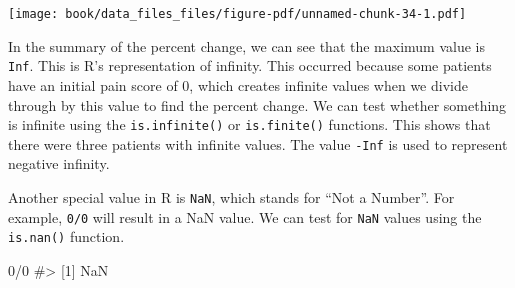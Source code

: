 \documentclass[
  letterpaper,
]{krantz}
\makeatletter
\newenvironment{Shaded}{\begin{snugshade}}{\end{snugshade}}
\newcommand{\CommentTok}[1]{\textcolor[rgb]{0.37,0.37,0.37}{#1}}
\newcommand{\DecValTok}[1]{\textcolor[rgb]{0.68,0.00,0.00}{#1}}
\newcommand{\FunctionTok}[1]{\textcolor[rgb]{0.28,0.35,0.67}{#1}}
\newcommand{\NormalTok}[1]{\textcolor[rgb]{0.00,0.23,0.31}{#1}}
\newcommand{\OtherTok}[1]{\textcolor[rgb]{0.00,0.23,0.31}{#1}}
\newcommand{\SpecialCharTok}[1]{\textcolor[rgb]{0.37,0.37,0.37}{#1}}
\newenvironment{kframe}{%
\medskip{}
\setlength{\fboxsep}{.8em}
 \def\at@end@of@kframe{}%
 \ifinner\ifhmode%
  \def\at@end@of@kframe{\end{minipage}}%
  \begin{minipage}{\columnwidth}%
 \fi\fi%
 \def\FrameCommand##1{\hskip\@totalleftmargin \hskip-\fboxsep
 \colorbox{shadecolor}{##1}\hskip-\fboxsep
     \hskip-\linewidth \hskip-\@totalleftmargin \hskip\columnwidth}%
 \MakeFramed {\advance\hsize-\width
   \@totalleftmargin\z@ \linewidth\hsize
   \@setminipage}}%
 {\par\unskip\endMakeFramed%
 \at@end@of@kframe}
\renewenvironment{Shaded}{\begin{kframe}}{\end{kframe}}
\makeatother
\begin{document}
\begin{center}
\texttt{[image: book/data\_files\_files/figure-pdf/unnamed-chunk-34-1.pdf]}
\end{center}

\begin{Shaded}
\end{Shaded}

In the summary of the percent change, we can see that the maximum value
is \texttt{Inf}. This is R's representation of infinity. This occurred
because some patients have an initial pain score of 0, which creates
infinite values when we divide through by this value to find the percent
change. We can test whether something is infinite using the
\texttt{is.infinite()} or \texttt{is.finite()} functions. This shows
that there were three patients with infinite values. The value
\texttt{-Inf} is used to represent negative infinity.

\begin{Shaded}
\end{Shaded}

Another special value in R is \texttt{NaN}, which stands for ``Not a
Number''. For example, \texttt{0/0} will result in a NaN value. We can
test for \texttt{NaN} values using the \texttt{is.nan()} function.

\begin{Shaded}
\begin{Highlighting}[]
\DecValTok{0}\SpecialCharTok{/}\DecValTok{0}
\CommentTok{\#\textgreater{} [1] NaN}
\end{Highlighting}
\end{Shaded}
\end{document}
